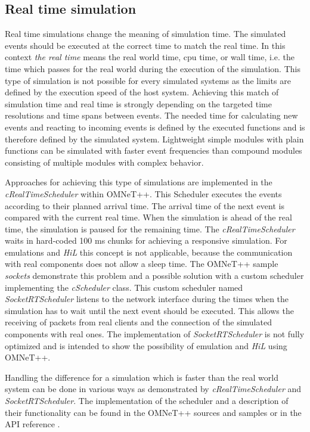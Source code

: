 \documentclass[journal]{IEEEtran}
\begin{document}
\subsection{Real time simulation}
\label{sec:RealTimeSimulation}
Real time simulations change the meaning of simulation time.
The simulated events should be executed at the correct time to match the real time.
In this context \emph{the real time} means the real world time, cpu time, or wall time, i.e. the time which passes for the real world during the execution of the simulation.
This type of simulation is not possible for every simulated systems as the limits are defined by the execution speed of the host system.
Achieving this match of simulation time and real time is strongly depending on the targeted time resolutions and time spans between events.
The needed time for calculating new events and reacting to incoming events is defined by the executed functions and is therefore defined by the simulated system.
Lightweight simple modules with plain functions can be simulated with faster event frequencies than compound modules consisting of multiple modules with complex behavior.

Approaches for achieving this type of simulations are implemented in the \emph{cRealTimeScheduler} within OMNeT++.
This Scheduler executes the events according to their planned arrival time.
The arrival time of the next event is compared with the current real time.
When the simulation is ahead of the real time, the simulation is paused for the remaining time.
The \emph{cRealTimeScheduler} waits in hard-coded 100 ms chunks for achieving a responsive simulation.
For emulations and \emph{HiL} this concept is not applicable, because the communication with real components does not allow a sleep time.
The OMNeT++ sample \emph{sockets} demonstrate this problem and a possible solution with a custom scheduler implementing the \emph{cScheduler} class.
This custom scheduler named \emph{SocketRTScheduler} listens to the network interface during the times when the simulation has to wait until the next event should be executed.
This allows the receiving of packets from real clients and the connection of the simulated components with real ones.
The implementation of \emph{SocketRTScheduler} is not fully optimized and is intended to show the possibility of emulation and \emph{HiL} using OMNeT++.

Handling the difference for a simulation which is faster than the real world system can be done in various ways as demonstrated by \emph{cRealTimeScheduler} and \emph{SocketRTScheduler}.
The implementation of the scheduler and a description of their functionality can be found in the OMNeT++ sources and samples or in the API reference \cite{OMNETAPIREF}.
\end{document}
